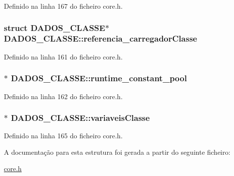 Definido na linha 167 do ficheiro core.\-h.

\hypertarget{struct_d_a_d_o_s___c_l_a_s_s_e_af50666164c0a79d63ff831010e8318c9}{
\subsubsection[{referencia\-\_\-carregador\-Classe}]{\setlength{\rightskip}{0pt plus 5cm}struct {\bf D\-A\-D\-O\-S\-\_\-\-C\-L\-A\-S\-S\-E}$\ast$ D\-A\-D\-O\-S\-\_\-\-C\-L\-A\-S\-S\-E\-::referencia\-\_\-carregador\-Classe}}\label{struct_d_a_d_o_s___c_l_a_s_s_e_af50666164c0a79d63ff831010e8318c9}


Definido na linha 161 do ficheiro core.\-h.

\hypertarget{struct_d_a_d_o_s___c_l_a_s_s_e_a0c018490460fc694fc1bcdeddbd49e02}{
\subsubsection[{runtime\-\_\-constant\-\_\-pool}]{$\ast$ D\-A\-D\-O\-S\-\_\-\-C\-L\-A\-S\-S\-E\-::runtime\-\_\-constant\-\_\-pool}}\label{struct_d_a_d_o_s___c_l_a_s_s_e_a0c018490460fc694fc1bcdeddbd49e02}


Definido na linha 162 do ficheiro core.\-h.

\hypertarget{struct_d_a_d_o_s___c_l_a_s_s_e_a61814affa4242c9de4ab4380163ae315}{
\subsubsection[{variaveis\-Classe}]{$\ast$ D\-A\-D\-O\-S\-\_\-\-C\-L\-A\-S\-S\-E\-::variaveis\-Classe}}\label{struct_d_a_d_o_s___c_l_a_s_s_e_a61814affa4242c9de4ab4380163ae315}


Definido na linha 165 do ficheiro core.\-h.



A documentação para esta estrutura foi gerada a partir do seguinte ficheiro\-:\begin{DoxyCompactItemize}
\item 
\hyperlink{core_8h}{core.\-h}\end{DoxyCompactItemize}
